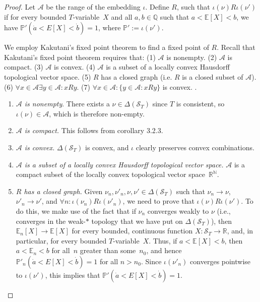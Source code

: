 \documentclass[12pt]{article}
\newcommand{\PP}{\mathbb{P}}
\newcommand{\EE}{\mathbb{E}}
\newcommand{\RR}{\mathbb{R}}
\newcommand{\NN}{\mathbb{N}}
\newcommand{\QQ}{\mathbb{Q}}
\newcommand{\cA}{\mathcal{A}}
\newcommand{\cS}{\mathcal{S}}
\newcommand{\Tvar}{$T$-variable}
\theoremstyle{plain}
\theoremstyle{definition}
\theoremstyle{remark}
\begin{document}
\begin{proof}
Let $\cA$ be the range of the embedding $\iota$. Define $R$, such that $\iota(\nu)R\iota(\nu')$ if for every bounded \Tvar{}~$X$ and all $a,b\in\QQ$ such that $a<\EE[X]<b$, we have $\PP'(\dot a < E[X] < \dot b)= 1$, where $\PP':=\iota(\nu')$.

We employ Kakutani's fixed point theorem to find a fixed point of $R$. Recall that Kakutani's fixed point theorem requires that:
(1) $\mathcal{A}$ is nonempty.
(2) $\mathcal{A}$ is compact.
(3) $\mathcal{A}$ is convex.
(4) $\mathcal{A}$ is a subset of a locally convex Hausdorff topological vector space.
(5) $R$ has a closed graph (i.e. $R$ is a closed subset of $\cA$).
(6) $\forall x\in\cA \exists y\in\cA : xRy$.
(7) $\forall x\in\cA:\{y \in \mathcal{A}: xRy\}$ is convex.
\cite{kakutani41}.

\begin{enumerate}
\item \emph{$\mathcal{A}$ is nonempty}. There exists a $\nu\in\Delta(\cS_T)$ since $T$ is consistent, so $\iota(\nu)\in\cA$, which is therefore non-empty.

\item \emph{$\mathcal{A}$ is compact.} This follows from corollary 3.2.3.

\item \emph{$\mathcal{A}$ is convex.} $\Delta(\cS_T)$ is convex, and $\iota$ clearly preserves convex combinations.

\item \emph{$\mathcal{A}$ is a subset of a locally convex Hausdorff topological vector space.} $\mathcal{A}$ is a compact subset of the locally convex topological vector space~$\RR^\NN$.

\item \emph{$R$ has a closed graph.} Given $\nu_n,\nu'_n,\nu,\nu'\in\Delta(\cS_T)$ such that $\nu_n\to\nu$, $\nu'_n\to\nu'$, and $\forall n : \iota(\nu_n)R\iota(\nu'_n)$, we need to prove that $\iota(\nu)R\iota(\nu')$. 
To do this, we make use of the fact that if $\nu_n$ converges weakly to $\nu$ (i.e., converges in the weak-$*$ topology that we have put on $\Delta(\cS_T)$), then $\EE_n[X]\to\EE[X]$ for every bounded, continuous function $X : \cS_T\to\RR$, and, in particular, for every bounded \Tvar{}~$X$. 
Thus, if $a < \EE[X] < b$, then $a < \EE_n < b$ for all~$n$ greater than some~$n_0$, and hence $\PP'_n(\dot a < E[X] < \dot b) = 1$ for all $n>n_0$.
Since $\iota(\nu'_n)$ converges pointwise to $\iota(\nu')$, this implies that $\PP'(\dot a < E[X] < \dot b) = 1$.


\end{enumerate}
\end{proof}
\end{document}
